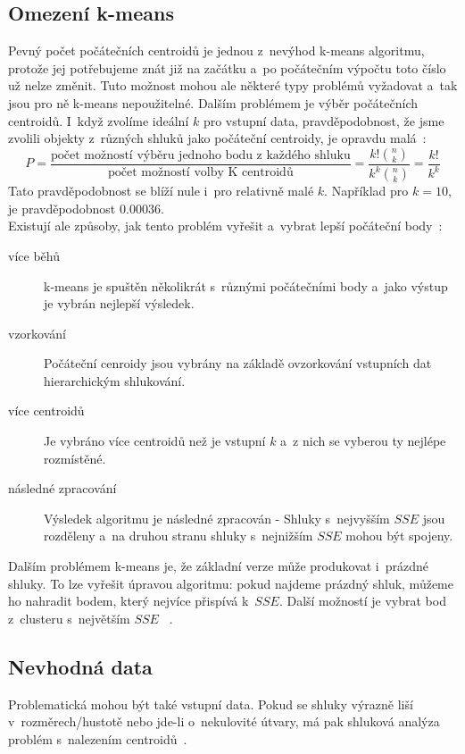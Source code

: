 \subsection{Omezení k-means}
Pevný počet počátečních centroidů je jednou z~nevýhod k-means algoritmu, protože jej potřebujeme znát již na začátku a~po počátečním výpočtu toto číslo už nelze změnit. Tuto možnost mohou ale některé typy problémů vyžadovat a~tak jsou pro ně k-means nepoužitelné. Dalším problémem je výběr počátečních centroidů. I~když zvolíme ideální $k$ pro vstupní data, pravděpodobnost, že jsme zvolili objekty z~různých shluků jako počáteční centroidy, je opravdu malá~\cite{Tan05}: $$P = \frac{\mbox{počet možností výběru jednoho bodu z~každého shluku}}{\mbox{počet možností volby K~centroidů}}=\frac{k!{n \choose k}}{k^k {n \choose k} }=\frac{k!}{k^k}$$ Tato pravděpodobnost se blíží nule i~pro relativně malé $k$. Například pro $k=10$, je pravděpodobnost $0.00036$. \\

Existují ale způsoby, jak tento problém vyřešit a~vybrat lepší počáteční body~\cite{Tan05}:
\begin{description}
\item[více běhů] k-means je spuštěn několikrát s~různými počátečními body a~jako výstup je vybrán nejlepší výsledek.
\item[vzorkování] Počáteční cenroidy jsou vybrány na základě ovzorkování vstupních dat hierarchickým shlukování.
\item[více centroidů] Je vybráno více centroidů než je vstupní $k$ a~z nich se vyberou ty nejlépe rozmístěné.
\item[následné zpracování] Výsledek algoritmu je následné zpracován - Shluky s~nej\-vyš\-ším $SSE$ jsou rozděleny a~na druhou stranu shluky s~nejnižším $SSE$ mohou být spojeny.
\end{description} 

Dalším problémem k-means je, že základní verze může produkovat i~prázdné shluky. To lze vyřešit úpravou algoritmu: pokud najdeme prázdný shluk, můžeme ho nahradit bodem, který nejvíce přispívá k~$SSE$. Další možností je vybrat bod z~clusteru s~největším $SSE$ ~\cite{Tan05}.\\

\subsection{Nevhodná data}
Problematická mohou být také vstupní data. Pokud se shluky výrazně liší v~rozměrech/hustotě nebo jde-li o~nekulovité útvary, má pak shluková analýza problém s~nalezením centroidů~\cite{Tan05}. \\

